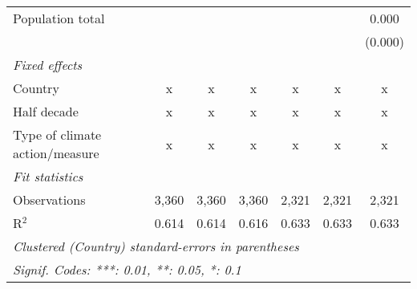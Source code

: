 \begin{tabular}{lcccccc}
   Population total                                                        &         &                &                &                &                & 0.000\\   
                                                                           &         &                &                &                &                & (0.000)\\   
   \emph{Fixed effects}\\
   Country                                                                 & x       & x              & x              & x              & x              & x\\  
   Half decade                                                             & x       & x              & x              & x              & x              & x\\  
   Type of climate action/measure                                          & x       & x              & x              & x              & x              & x\\  
   \midrule \emph{Fit statistics}\\
   Observations                                                            & 3,360   & 3,360          & 3,360          & 2,321          & 2,321          & 2,321\\  
   R$^2$                                                                   & 0.614   & 0.614          & 0.616          & 0.633          & 0.633          & 0.633\\  
   \midrule
   \multicolumn{7}{l}{\emph{Clustered (Country) standard-errors in parentheses}}\\
   \multicolumn{7}{l}{\emph{Signif. Codes: ***: 0.01, **: 0.05, *: 0.1}}\\
\end{tabular}
\par\endgroup



